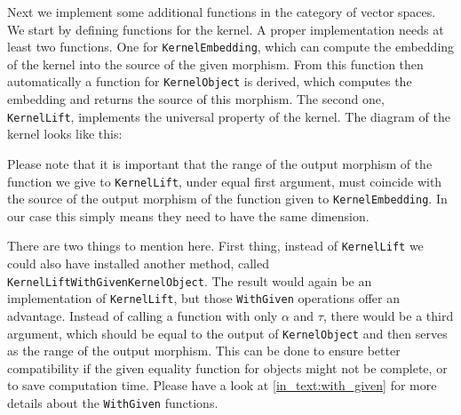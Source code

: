 

Next we implement some additional functions in the category of vector spaces. We start by defining functions for the kernel.
A proper implementation needs at least two functions. One for \texttt{KernelEmbedding}, which can compute the embedding of the kernel
into the source of the given morphism. From this function then automatically a function for \texttt{KernelObject} is derived, which
computes the embedding and returns the source of this morphism. The second one, \texttt{KernelLift}, implements the universal property of the kernel.
The diagram of the kernel looks like this:
\begin{center}
\end{center}

Please note that it is important that the range of the output morphism of the function we give to \texttt{KernelLift},
under equal first argument, must coincide with the source of the output morphism of the function given to \texttt{KernelEmbedding}.
In our case this simply means they need to have the same dimension.



There are two things to mention here.
First thing, instead of \texttt{KernelLift} we could also have installed another method,
called \texttt{KernelLiftWithGivenKernelObject}. The result would again be an implementation of \texttt{KernelLift}, but those
\texttt{WithGiven} operations offer an advantage. Instead of calling a function with only $\alpha$ and $\tau$, there
would be a third argument, which should be equal to the output of \texttt{KernelObject} and then serves as the range of the output morphism.
This can be done to ensure better compatibility if the given equality function for objects might not be complete, or to save computation time.
Please have a look at \ref{in_text:with_given} for more details about the \texttt{WithGiven} functions.

